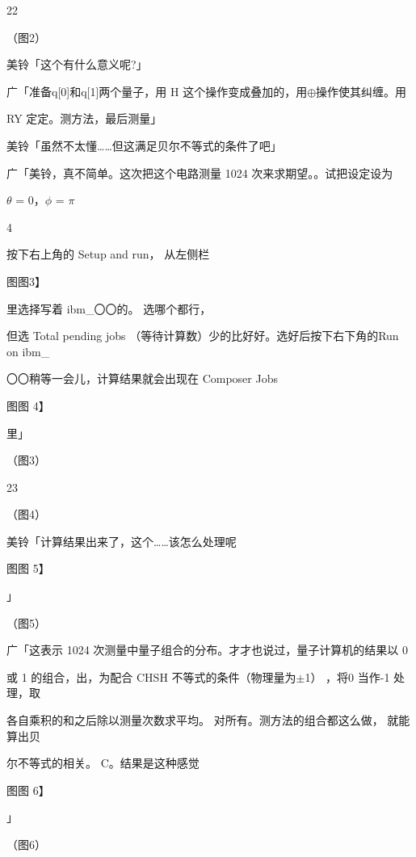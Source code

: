 22\par
（图2）\par
美铃「这个有什么意义呢?」\par
广「准备q[0]和q[1]两个量子，用 H 这个操作变成叠加的，用$\oplus$操作使其纠缠。用\par
RY 定定。测方法，最后测量」\par
美铃「虽然不太懂……但这满足贝尔不等式的条件了吧」\par
广「美铃，真不简单。这次把这个电路测量 1024 次来求期望。。试把设定设为\par
$\theta$ = 0，$\phi$ = $\pi$\par
4\par
按下右上角的 Setup and run， 从左侧栏\par
图图3】\par
里选择写着 ibm\_〇〇的。 选哪个都行，\par
但选 Total pending jobs （等待计算数）少的比好好。选好后按下右下角的Run on ibm\_\par
〇〇稍等一会儿，计算结果就会出现在 Composer Jobs\par
图图 4】\par
里」\par
（图3）\par

23\par
（图4）\par
美铃「计算结果出来了，这个……该怎么处理呢\par
图图 5】\par
」\par
（图5）\par
广「这表示 1024 次测量中量子组合的分布。才才也说过，量子计算机的结果以 0\par
或 1 的组合，出，为配合 CHSH 不等式的条件（物理量为$\pm$1） ，将0 当作-1 处理，取\par
各自乘积的和之后除以测量次数求平均。 对所有。测方法的组合都这么做， 就能算出贝\par
尔不等式的相关。 C。结果是这种感觉\par
图图 6】\par
」\par
（图6）\par

